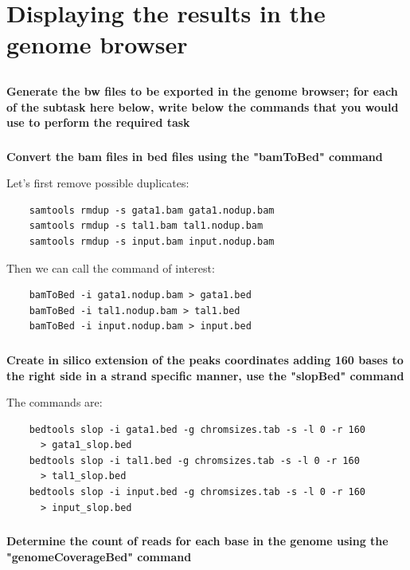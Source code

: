 \documentclass[12pt, a4paper]{article}
\begin{document}
	\section{Displaying the results in the genome browser}
	
	\subsection{}
	\textbf{Generate the bw files to be exported in the genome browser; for each of the subtask here below, write below the commands that you would use to perform the required task}
	
	\subsubsection{}
	\textbf{Convert the bam files in bed files using the "bamToBed" command}
	
	Let's first remove possible duplicates:
	
	\begin{verbatim}
	samtools rmdup -s gata1.bam gata1.nodup.bam
	samtools rmdup -s tal1.bam tal1.nodup.bam
	samtools rmdup -s input.bam input.nodup.bam
	\end{verbatim}
	
	Then we can call the command of interest:
	
	\begin{verbatim}
	bamToBed -i gata1.nodup.bam > gata1.bed
	bamToBed -i tal1.nodup.bam > tal1.bed
	bamToBed -i input.nodup.bam > input.bed
	\end{verbatim}
	
	\subsubsection{}
	\textbf{Create in silico extension of the peaks coordinates adding 160 bases to the right side in a strand specific manner, use the "slopBed" command}
	
	The commands are:
	
	\begin{verbatim}
	bedtools slop -i gata1.bed -g chromsizes.tab -s -l 0 -r 160
	  > gata1_slop.bed
	bedtools slop -i tal1.bed -g chromsizes.tab -s -l 0 -r 160
	  > tal1_slop.bed
	bedtools slop -i input.bed -g chromsizes.tab -s -l 0 -r 160
	  > input_slop.bed
	\end{verbatim}
	
	\subsubsection{}
	\textbf{Determine the count of reads for each base in the genome using the "genomeCoverageBed" command}
	
\end{document}
